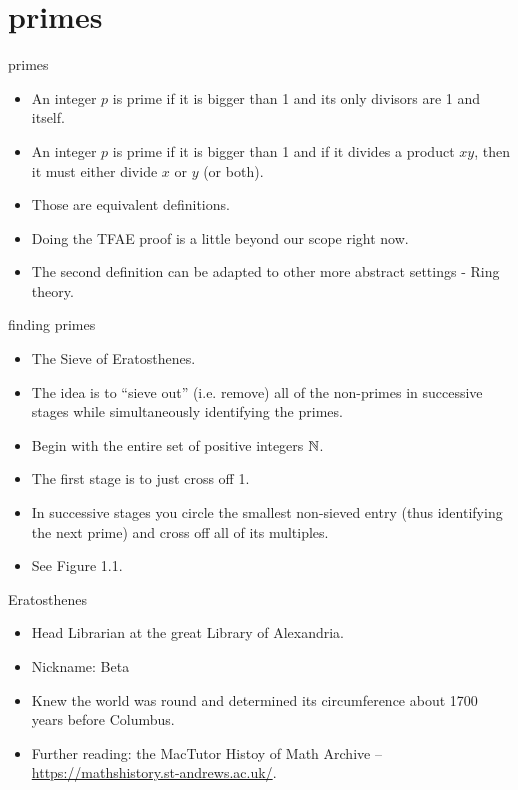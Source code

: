 \documentclass[landscape]{beamer}
\begin{document}
\section{primes}

\begin{frame}{primes}
\begin{itemize}
\item An integer $p$ is prime if it is bigger than 1 and its only divisors are 1 and itself. \pause
\item An integer $p$ is prime if it is bigger than 1 and if it divides a product $xy$, then it must either divide $x$ or $y$ (or both). \pause
\item Those are equivalent definitions.\pause
\item Doing the TFAE proof is a little beyond our scope right now.\pause 
\item The second definition can be adapted to other more abstract settings - Ring theory.
\end{itemize}
\end{frame}

\begin{frame}{finding primes}
\begin{itemize}
\item The Sieve of Eratosthenes. \pause
\item The idea is to ``sieve out'' (i.e. remove) all of the non-primes in successive stages while simultaneously identifying the primes. \pause
\item Begin with the entire set of positive integers ${\mathbb N}$. \pause
\item The first stage is to just cross off 1. \pause
\item In successive stages you circle the smallest non-sieved entry (thus identifying the next prime) and cross off all of its multiples. \pause
\item See Figure 1.1.
\end{itemize}
\end{frame}

\begin{frame}{Eratosthenes}
\begin{itemize}
\item Head Librarian at the great Library of Alexandria. \pause
\item Nickname: Beta \pause
\item Knew the world was round and determined its circumference about 1700 years before Columbus. \pause
\item Further reading: the MacTutor Histoy of Math Archive -- \href{https://mathshistory.st-andrews.ac.uk/}{https://mathshistory.st-andrews.ac.uk/}.
\end{itemize}
\end{frame}
\end{document}
